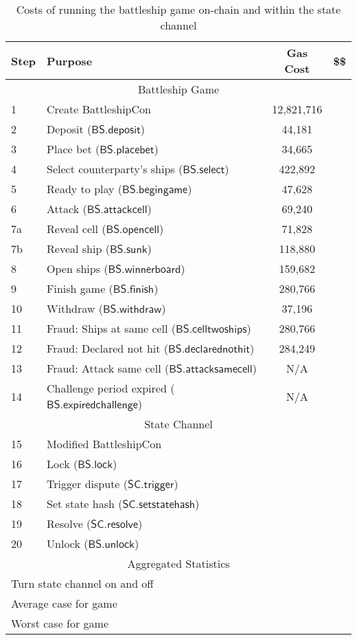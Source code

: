 \documentclass{llncs}
\newcommand{\statechanneldispute}{\mathsf{SC}.\mathsf{trigger}}
\newcommand{\statechannelsetstate}{\mathsf{SC}.\mathsf{setstatehash}}
\newcommand{\statechannelresolve}{\mathsf{SC}.\mathsf{resolve}}
\newcommand{\battleshipattackcell}{\mathsf{BS.attackcell}}
\newcommand{\battleshipbegin}{\mathsf{BS.begingame}}
\newcommand{\battleshipplacebet}{\mathsf{BS.placebet}}
\newcommand{\battleshipselectboard}{\mathsf{BS.select}}
\newcommand{\battleshiprevealcell}{\mathsf{BS.opencell}}
\newcommand{\battleshipsinking}{\mathsf{BS.sunk}}
\newcommand{\battleshiprevealboard}{\mathsf{BS.winnerboard}}
\newcommand{\battleshipdeposit}{\mathsf{BS.deposit}}
\newcommand{\battleshipwithdraw}{\mathsf{BS.withdraw}}
\newcommand{\battleshipfinish}{\mathsf{BS.finish}}
\newcommand{\battleshipdeclarednothit}{\mathsf{BS.declarednothit}}
\newcommand{\battleshipsamecell}{\mathsf{BS.attacksamecell}}
\newcommand{\battleshiptwoships}{\mathsf{BS.celltwoships}}
\newcommand{\battleshipchallengeexpired}{\mathsf{BS.expiredchallenge}}
\newcommand{\battleshiplock}{\mathsf{BS.lock}}
\newcommand{\battleshipunlock}{\mathsf{BS.unlock}}
\begin{document}
\begin{table}
	\centering
	\begin{tabular}[]{l l c c}
	
	\textbf{Step} & \textbf{Purpose} & \textbf{Gas Cost} & \textbf{\$\$}  \\ 
	\hline
	\multicolumn{4}{c}{Battleship Game} \\
	\hline
	1 & Create BattleshipCon & 12,821,716 & \\
	2 & Deposit ($\battleshipdeposit$) & 44,181 &  \\
	3 & Place bet ($\battleshipplacebet$)& 34,665 & \\
	4 & Select counterparty's ships ($\battleshipselectboard$) & 422,892 & \\ 
	5 & Ready to play ($\battleshipbegin$) & 47,628 & \\
	6 & Attack ($\battleshipattackcell$) & 69,240 & \\
	7a & Reveal cell ($\battleshiprevealcell$) & 71,828 & \\
	7b & Reveal ship ($\battleshipsinking$)& 118,880 & \\
	8 & Open ships ($\battleshiprevealboard$) & 159,682& \\
	9 & Finish game ($\battleshipfinish$) & 280,766 & \\
	10 & Withdraw ($\battleshipwithdraw$) & 37,196 & \\ 
	11 & Fraud: Ships at same cell ($\battleshiptwoships$) & 280,766 & \\
	12 & Fraud: Declared not hit ($\battleshipdeclarednothit$) & 284,249 & \\
	13 & Fraud: Attack same cell ($\battleshipsamecell$) & N/A & \\
	14 & Challenge period expired ($\battleshipchallengeexpired$) & N/A & \\
	\hline
	\multicolumn{4}{c}{State Channel} \\
	\hline
	15 & Modified BattleshipCon &  & \\
	16 & Lock ($\battleshiplock$) & & \\
	17 & Trigger dispute ($\statechanneldispute$) & & \\
	18 & Set state hash ($\statechannelsetstate$) & & \\
	19 & Resolve ($\statechannelresolve$) & & \\
	20 & Unlock ($\battleshipunlock$) & & \\
	\hline
	\multicolumn{4}{c}{Aggregated Statistics} \\
	\hline
	\multicolumn{2}{l}{Turn state channel on and off} &  & \\
	\multicolumn{2}{l}{Average case for game} &  & \\
	\multicolumn{2}{l}{Worst case for game} &  &  \\
	\hline 
\end{tabular}

	\caption{Costs of running the battleship game on-chain and within the state channel}
\end{table}
\end{document}
